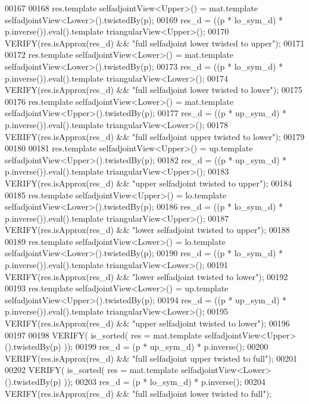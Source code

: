 \begin{DoxyCode}
00167   
00168   res.template selfadjointView<Upper>() = mat.template selfadjointView<Lower>().twistedBy(p);
00169   res\_d = ((p * lo\_sym\_d) * p.inverse()).eval().template triangularView<Upper>();
00170   VERIFY(res.isApprox(res\_d) && \textcolor{stringliteral}{"full selfadjoint lower twisted to upper"});
00171   
00172   res.template selfadjointView<Lower>() = mat.template selfadjointView<Lower>().twistedBy(p);
00173   res\_d = ((p * lo\_sym\_d) * p.inverse()).eval().template triangularView<Lower>();
00174   VERIFY(res.isApprox(res\_d) && \textcolor{stringliteral}{"full selfadjoint lower twisted to lower"});
00175   
00176   res.template selfadjointView<Lower>() = mat.template selfadjointView<Upper>().twistedBy(p);
00177   res\_d = ((p * up\_sym\_d) * p.inverse()).eval().template triangularView<Lower>();
00178   VERIFY(res.isApprox(res\_d) && \textcolor{stringliteral}{"full selfadjoint upper twisted to lower"});
00179   
00180   
00181   res.template selfadjointView<Upper>() = up.template selfadjointView<Upper>().twistedBy(p);
00182   res\_d = ((p * up\_sym\_d) * p.inverse()).eval().template triangularView<Upper>();
00183   VERIFY(res.isApprox(res\_d) && \textcolor{stringliteral}{"upper selfadjoint twisted to upper"});
00184   
00185   res.template selfadjointView<Upper>() = lo.template selfadjointView<Lower>().twistedBy(p);
00186   res\_d = ((p * lo\_sym\_d) * p.inverse()).eval().template triangularView<Upper>();
00187   VERIFY(res.isApprox(res\_d) && \textcolor{stringliteral}{"lower selfadjoint twisted to upper"});
00188   
00189   res.template selfadjointView<Lower>() = lo.template selfadjointView<Lower>().twistedBy(p);
00190   res\_d = ((p * lo\_sym\_d) * p.inverse()).eval().template triangularView<Lower>();
00191   VERIFY(res.isApprox(res\_d) && \textcolor{stringliteral}{"lower selfadjoint twisted to lower"});
00192   
00193   res.template selfadjointView<Lower>() = up.template selfadjointView<Upper>().twistedBy(p);
00194   res\_d = ((p * up\_sym\_d) * p.inverse()).eval().template triangularView<Lower>();
00195   VERIFY(res.isApprox(res\_d) && \textcolor{stringliteral}{"upper selfadjoint twisted to lower"});
00196 
00197   
00198   VERIFY( is\_sorted( res = mat.template selfadjointView<Upper>().twistedBy(p) ));
00199   res\_d = (p * up\_sym\_d) * p.inverse();
00200   VERIFY(res.isApprox(res\_d) && \textcolor{stringliteral}{"full selfadjoint upper twisted to full"});
00201   
00202   VERIFY( is\_sorted( res = mat.template selfadjointView<Lower>().twistedBy(p) ));
00203   res\_d = (p * lo\_sym\_d) * p.inverse();
00204   VERIFY(res.isApprox(res\_d) && \textcolor{stringliteral}{"full selfadjoint lower twisted to full"});

\end{DoxyCode}
